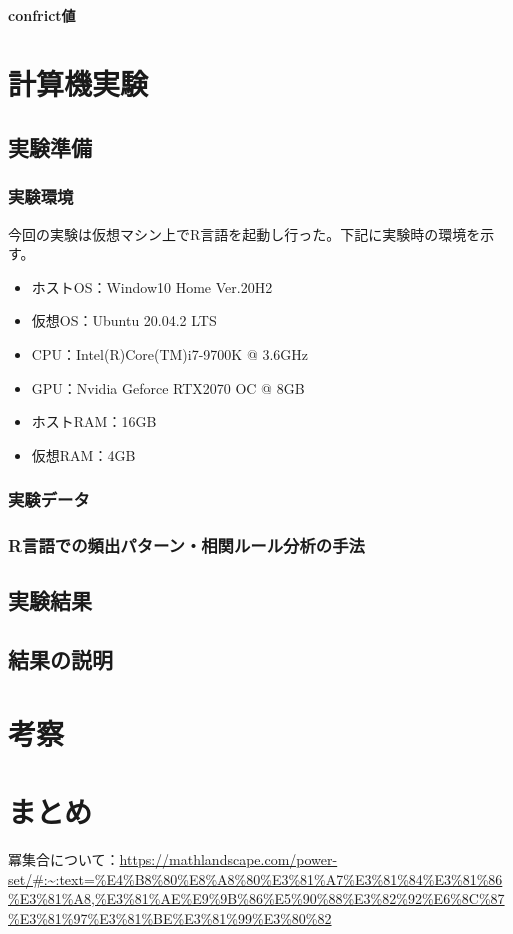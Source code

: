 \documentclass[dvipdfmx]{jsarticle}
\begin{document}
\paragraph{confrict値}



\section{計算機実験}
\subsection{実験準備}
  \subsubsection{実験環境}
  今回の実験は仮想マシン上でR言語を起動し行った。下記に実験時の環境を示す。
  \begin{itemize}
    \item ホストOS：Window10 Home Ver.20H2
    \item 仮想OS：Ubuntu 20.04.2 LTS
    \item CPU：Intel(R)Core(TM)i7-9700K @ 3.6GHz
    \item GPU：Nvidia Geforce RTX2070 OC @ 8GB
    \item ホストRAM：16GB
    \item 仮想RAM：4GB
  \end{itemize}
\subsubsection{実験データ}
\subsubsection{R言語での頻出パターン・相関ルール分析の手法}
\subsection{実験結果}
\subsection{結果の説明}

\section{考察}
\section{まとめ}

\begin{thebibliography}{99}
  \bibitem 冪集合について：\url{https://mathlandscape.com/power-set/#:~:text=%E4%B8%80%E8%A8%80%E3%81%A7%E3%81%84%E3%81%86%E3%81%A8,%E3%81%AE%E9%9B%86%E5%90%88%E3%82%92%E6%8C%87%E3%81%97%E3%81%BE%E3%81%99%E3%80%82}
\end{thebibliography}
\end{document}
